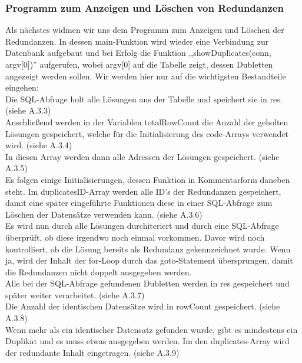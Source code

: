 \documentclass[12pt]{report}
\begin{document}
\subsubsection{Programm zum Anzeigen und Löschen von Redundanzen}
Als nächstes widmen wir uns dem Programm zum Anzeigen und Löschen der Redundanzen. In dessen main-Funktion wird wieder eine Verbindung zur Datenbank aufgebaut und bei Erfolg die Funktion ,,showDuplicates(conn, argv[0])'' aufgerufen, wobei argv[0] auf die Tabelle zeigt, dessen Dubletten angezeigt werden sollen. Wir werden hier nur auf die wichtigsten Bestandteile eingehen:\\

\noindent Die SQL-Abfrage holt alle Lösungen aus der Tabelle und speichert sie in res. (siehe A.3.3)\\

\noindent Anschließend werden in der Variablen totalRowCount die Anzahl der geholten Lösungen gespeichert, welche für die Initialisierung des code-Arrays verwendet wird. (siehe A.3.4)\\

\noindent In diesen Array werden dann alle Adressen der Lösungen gespeichert. (siehe A.3.5)\\

\noindent Es folgen einige Initialisierungen, dessen Funktion in Kommentarform daneben steht. Im duplicatesID-Array werden alle ID's der Redundanzen gespeichert, damit eine später eingeführte Funktionen diese in einer SQL-Abfrage zum Löschen der Datensätze verwenden kann. (siehe A.3.6)\\

\noindent Es wird nun durch alle Lösungen durchiteriert und durch eine SQL-Abfrage überprüft, ob diese irgendwo noch einmal vorkommen. Davor wird noch kontrolliert, ob die Lösung bereits als Redundanz gekennzeichnet wurde. Wenn ja, wird der Inhalt der for-Loop durch das goto-Statement übersprungen, damit die Redundanzen nicht doppelt ausgegeben werden.\\
Alle bei der SQL-Abfrage gefundenen Dubletten werden in res gespeichert und später weiter verarbeitet. (siehe A.3.7)\\

\noindent Die Anzahl der identischen Datensätze wird in rowCount gespeichert. (siehe A.3.8)\\

\noindent Wenn mehr als ein identischer Datensatz gefunden wurde, gibt es mindestens ein Duplikat und es muss etwas ausgegeben werden. Im den duplicates-Array wird der redundante Inhalt eingetragen. (siehe A.3.9)\\
\end{document}
